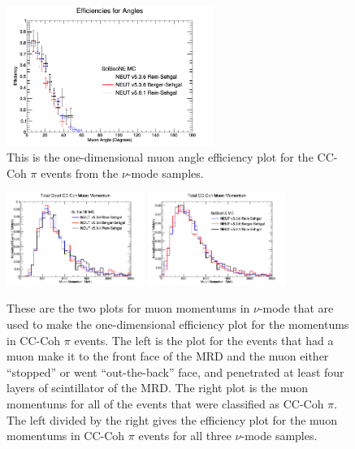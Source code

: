 \documentclass[11pt]{article}
\begin{document}
\begin{figure}[H]
\centering
\includegraphics[width=0.6\textwidth]{NMCombinedPlotsImages/24-NMCombinedPlots.png}
\caption{This is the one-dimensional muon angle efficiency plot for the CC-Coh $\pi$ events from the $\nu$-mode samples.}
\label{fig:app:NMCCCohAng1DEff}
\end{figure}

\begin{figure}[H]
\centering
\includegraphics[width=0.4\textwidth]{NMCombinedPlotsImages/15-NMCombinedPlots.png}
\includegraphics[width=0.4\textwidth]{NMCombinedPlotsImages/17-NMCombinedPlots.png}
\caption{These are the two plots for muon momentums in $\nu$-mode that are used to make the one-dimensional efficiency plot for the momentums in CC-Coh $\pi$ events. The left is the plot for the events that had a muon make it to the front face of the MRD and the muon either ``stopped'' or went ``out-the-back'' face, and penetrated at least four layers of scintillator of the MRD. The right plot is the muon momentums for all of the events that were classified as CC-Coh $\pi$. The left divided by the right gives the efficiency plot for the muon momentums in CC-Coh $\pi$ events for all three $\nu$-mode samples.}
\label{fig:app:NMCCCohMuonMom}
\end{figure}
\end{document}
